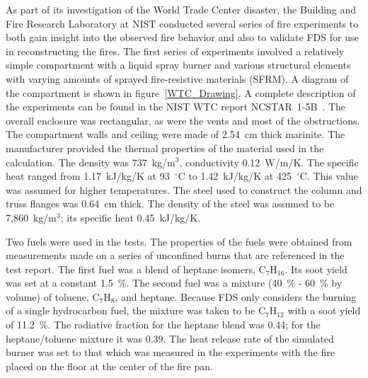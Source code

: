 As part of its investigation of the World Trade Center disaster, the Building and Fire Research Laboratory at NIST conducted several series of fire experiments to both gain insight into the
observed fire behavior and also to validate FDS for use in reconstructing the fires. The first series of experiments involved a relatively simple compartment with a liquid spray burner and
various structural elements with varying amounts of sprayed fire-resistive materials (SFRM). A diagram of the compartment is shown in figure~\ref{WTC_Drawing}.
A complete description of the experiments can be found in the NIST WTC report NCSTAR~1-5B~\cite{NIST_NCSTAR_1-5B}.
The overall enclosure was rectangular, as were the vents and most of the obstructions. The compartment walls and ceiling were made of 2.54~cm thick marinite. The manufacturer provided the thermal properties of the material used in the calculation. The density was 737~kg/m$^3$, conductivity 0.12~W/m/K. The specific heat ranged from 1.17~kJ/kg/K at 93~$^\circ$C to
1.42~kJ/kg/K at 425~$^\circ$C. This value was assumed for higher temperatures.
The steel used to construct the column and truss flanges was 0.64~cm thick.  The density of the steel was assumed to be 7,860~kg/m$^3$; its specific heat 0.45~kJ/kg/K.

Two fuels were used in the tests. The properties of the fuels were obtained from measurements made on a series of unconfined burns that are referenced in the test report.
The first fuel was a blend of heptane isomers, C$_7$H$_{16}$. Its soot yield was set at a constant 1.5~\%. The second fuel was a mixture (40~\% - 60~\% by volume) of toluene, C$_7$H$_8$,
and heptane. Because FDS only considers the burning of a single hydrocarbon fuel, the mixture was taken to be C$_7$H$_{12}$ with a soot yield of 11.2~\%.
The radiative fraction for the heptane blend was 0.44; for the heptane/toluene mixture it was 0.39.
The heat release rate of the simulated burner was set to that which was measured in the experiments with the fire placed on the floor at the center of the fire pan.


